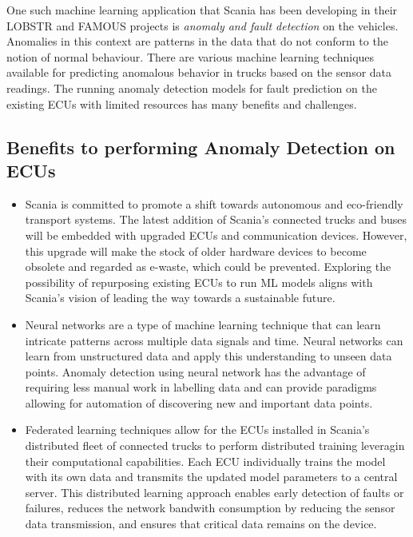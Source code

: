 One such machine learning application that Scania has been developing in their \textsc{LOBSTR} \cite{lobstr} and \textsc{FAMOUS} \cite{famous} projects is \textit{anomaly and fault detection} on the vehicles. Anomalies in this context are patterns in the data that do not conform to the notion of normal behaviour. There are various machine learning techniques available for predicting anomalous behavior in trucks based on the sensor data readings. The running anomaly detection models for fault prediction on the existing ECUs with limited resources has many benefits and challenges.

\subsection*{Benefits to performing Anomaly Detection on ECUs}

\begin{itemize}
	\item Scania is committed to promote a shift towards autonomous and eco-friendly transport systems. The latest addition of Scania's connected trucks and buses will be embedded with upgraded ECUs and communication devices. However, this upgrade will make the stock of older hardware devices to become obsolete and regarded as e-waste, which could be prevented. Exploring the possibility of repurposing existing ECUs to run ML models aligns with Scania's vision of leading the way towards a sustainable future.
	\item Neural networks are a type of machine learning technique that can learn intricate patterns across multiple data signals and time. Neural networks can learn from unstructured data and apply this understanding to unseen data points. Anomaly detection using neural network has the advantage of requiring less manual work in labelling data and can provide paradigms allowing for automation of discovering new and important data points.
	\item Federated learning techniques allow for the ECUs installed in Scania's distributed fleet of connected trucks to perform distributed training leveragin their computational capabilities. Each ECU individually trains the model with its own data and transmits the updated model parameters to a central server. This distributed learning approach enables early detection of faults or failures, reduces the network bandwith consumption by reducing the sensor data transmission, and ensures that critical data remains on the device.
\end{itemize}

